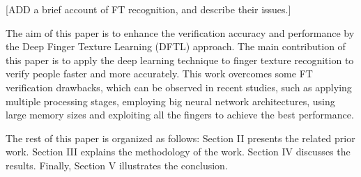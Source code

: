 \documentclass[conference]{IEEEtran}
\begin{document}
[ADD a brief account of FT recognition, and describe their issues.]

The aim of this paper is to enhance the verification accuracy and performance by the Deep Finger Texture Learning (DFTL) approach. The main contribution of this paper is to apply the deep learning technique to finger texture recognition to verify people faster and more accurately. This work overcomes some FT verification drawbacks, which can be observed in recent studies, such as applying multiple processing stages, employing big neural network architectures, using large memory sizes and exploiting all the fingers to achieve the best performance.

The rest of this paper is organized as follows: Section II presents the related prior work. Section III explains the methodology of the work. Section IV discusses the results. Finally, Section V illustrates the conclusion.
\end{document}
